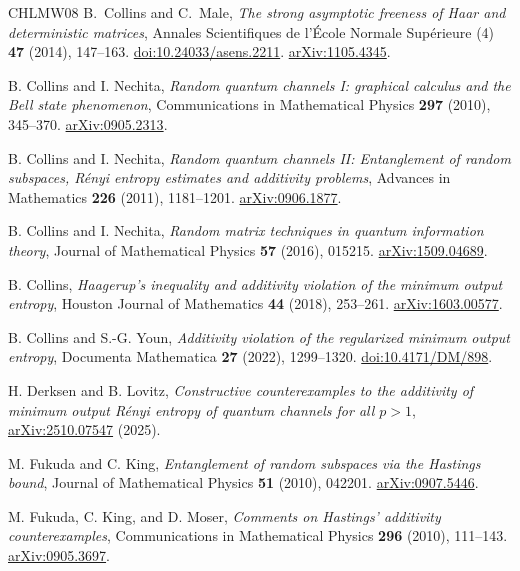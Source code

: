 \documentclass[11pt]{article}
\numberwithin{equation}{section}
\theoremstyle{boldremark}\newtheorem{remark}[theorem]{Remark}
\begin{document}
\begin{thebibliography}{CHLMW08}
B.~Collins and C.~Male,
\emph{The strong asymptotic freeness of Haar and deterministic matrices},
Annales Scientifiques de l'\'Ecole Normale Sup\'erieure (4)
\textbf{47} (2014), 147--163.
\href{https://doi.org/10.24033/asens.2211}{doi:10.24033/asens.2211}.
\href{https://arxiv.org/abs/1105.4345}{arXiv:1105.4345}.

B. Collins and I. Nechita,
\emph{Random quantum channels I: graphical calculus and the Bell state phenomenon},
Communications in Mathematical Physics \textbf{297} (2010), 345--370.
\href{https://arxiv.org/abs/0905.2313}{arXiv:0905.2313}.

B. Collins and I. Nechita,
\emph{Random quantum channels II: Entanglement of random subspaces, R\'enyi entropy estimates and additivity problems},
Advances in Mathematics \textbf{226} (2011), 1181--1201.
\href{https://arxiv.org/abs/0906.1877}{arXiv:0906.1877}.

B. Collins and I. Nechita,
\emph{Random matrix techniques in quantum information theory},
Journal of Mathematical Physics \textbf{57} (2016), 015215.
\href{https://arxiv.org/abs/1509.04689}{arXiv:1509.04689}.

B. Collins,
\emph{Haagerup's inequality and additivity violation of the minimum output entropy},
Houston Journal of Mathematics \textbf{44} (2018), 253--261.
\href{https://arxiv.org/abs/1603.00577}{arXiv:1603.00577}.

B. Collins and S.-G. Youn,
\emph{Additivity violation of the regularized minimum output entropy},
Documenta Mathematica \textbf{27} (2022), 1299--1320.
\href{https://doi.org/10.4171/DM/898}{doi:10.4171/DM/898}.

H. Derksen and B. Lovitz,
\emph{Constructive counterexamples to the additivity of minimum output R\'enyi entropy of quantum channels for all $p>1$},
\href{https://arxiv.org/abs/2510.07547}{arXiv:2510.07547} (2025).

M. Fukuda and C. King,
\emph{Entanglement of random subspaces via the Hastings bound},
Journal of Mathematical Physics \textbf{51} (2010), 042201.
\href{https://arxiv.org/abs/0907.5446}{arXiv:0907.5446}.

M. Fukuda, C. King, and D. Moser,
\emph{Comments on Hastings' additivity counterexamples},
Communications in Mathematical Physics \textbf{296} (2010), 111--143.
\href{https://arxiv.org/abs/0905.3697}{arXiv:0905.3697}.


\end{thebibliography}
\end{document}
